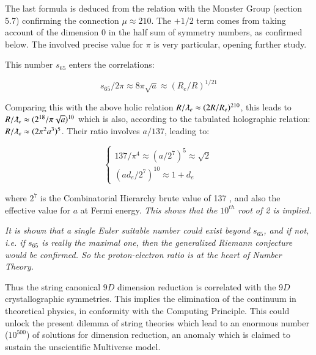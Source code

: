\documentclass[a4paper,9pt]{article}
\begin{document}
The last formula is deduced from the relation with the Monster Group (section 5.7) confirming the connection $\mu \approx 210$. The $+1/2$ term comes from taking account of the dimension $0$ in the half sum of symmetry numbers, as confirmed below. The involved precise value for $\pi$ is very particular, opening further study.

This number $s_{65}$ enters the correlations:

\begin{equation}\label{Eq19}
s_{65}/2\pi \approx 8\pi \sqrt a \approx (R_e/R)^{1/21}
 \end{equation}

Comparing this with the above holic relation $R/ \lambdabar_e \approx (2R/R_e)^{210}$, this leads to $R/\lambdabar_e \approx (2^{18}/\pi \sqrt a)^{10}$ which is also, according to the tabulated holographic relation: $R/\lambdabar_e \approx (2 \pi^2 a^3)^{5}$. Their ratio involves $a/137$, leading to: 

\begin{equation}\label{Eq21}
 \left\{
    \begin{array}{ll}
        137 / \pi^4 \approx (a/2^7)^5  \approx \sqrt 2 \\
       (ad_e/2^7)^{10} \approx 1 + d_e
    \end{array}
\right.
\end{equation}

where $2^7$ is the Combinatorial Hierarchy brute value of 137 \cite {Bastin}, and also the effective value for $a$ at Fermi energy. \textit{This shows that the $10^{th}$ root of 2 is implied.}

\textit{It is shown \cite{Weinberger} that a single Euler suitable number could exist beyond $s_{65}$, and if not, i.e. if $s_{65}$ is really the maximal one, then the generalized Riemann conjecture would be confirmed. So the proton-electron ratio is at the heart of Number Theory.}

Thus the string canonical $9D$ dimension reduction is correlated with the $9D$ crystallographic symmetries. This implies the elimination of the continuum in theoretical physics, in conformity with the Computing Principle. This could unlock the present dilemma of string theories which lead to an enormous number ($10^{500}$) of solutions for dimension reduction, an anomaly which is claimed to sustain the unscientific Multiverse model.

\end{document}
